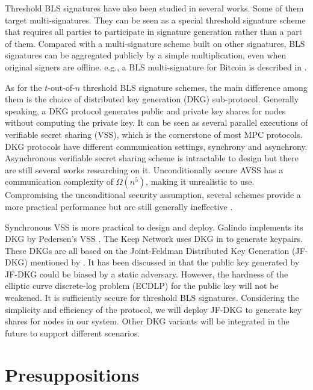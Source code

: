 \documentclass[11pt]{article}
\begin{document}
Threshold BLS signatures have also been studied in several works. Some of them target multi-signatures. They can be seen as a special threshold signature scheme that requires all parties to participate in signature generation rather than a part of them. Compared with a multi-signature scheme built on other signatures, BLS signatures can be aggregated publicly by a simple multiplication, even when original signers are offline. e.g., a BLS multi-signature for Bitcoin is described in \cite{boneh2018compact}. 

As for the $t$-out-of-$n$ threshold BLS signature schemes, the main difference among them is the choice of distributed key generation (DKG) sub-protocol. Generally speaking, a DKG protocol generates public and private key shares for nodes without computing the private key. It can be seen as several parallel executions of verifiable secret sharing (VSS), which is the cornerstone of most MPC protocols. DKG protocols have different communication settings, synchrony and asynchrony. Asynchronous verifiable secret sharing scheme is intractable to design but there are still several works researching on it. Unconditionally secure AVSS has a communication complexity of $\Omega(n^5)$, making it unrealistic to use. Compromising the unconditional security assumption, several schemes provide a more practical performance but are still generally ineffective \cite{kate2012distributed}.

Synchronous VSS is more practical to design and deploy. Galindo \cite{galindo2021fully} implements its DKG by Pedersen's VSS \cite{pedersen1991threshold}. The Keep Network \cite{keep2022doc} uses DKG in \cite{gennaro2007secure} to generate keypairs. These DKGs are all based on the Joint-Feldman Distributed Key Generation (JF-DKG) mentioned by \cite{pedersen1991non}. It has been discussed in \cite{gennaro2007secure} that the public key generated by JF-DKG could be biased by a static adversary. However, the hardness of the elliptic curve discrete-log problem (ECDLP) for the public key will not be weakened. It is sufficiently secure for threshold BLS signatures. Considering the simplicity and efficiency of the protocol, we will deploy JF-DKG to generate key shares for nodes in our system. Other DKG variants will be integrated in the future to support different scenarios.

\section{Presuppositions}
\end{document}
